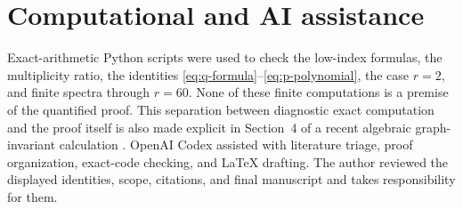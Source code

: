 \documentclass[11pt]{article}
\begin{document}
\section*{Computational and AI assistance}

Exact-arithmetic Python scripts were used to check the low-index formulas,
the multiplicity ratio, the identities \eqref{eq:q-formula}--\eqref{eq:p-polynomial},
the case $r=2$, and finite spectra through $r=60$.  None of these finite
computations is a premise of the quantified proof.  This separation between
diagnostic exact computation and the proof itself is also made explicit in
Section~4 of a recent algebraic graph-invariant calculation \cite{Zeng2026}.
OpenAI Codex assisted with literature triage, proof organization, exact-code
checking, and LaTeX drafting.  The author reviewed the displayed identities,
scope, citations, and final manuscript and takes responsibility for them.



\end{document}
